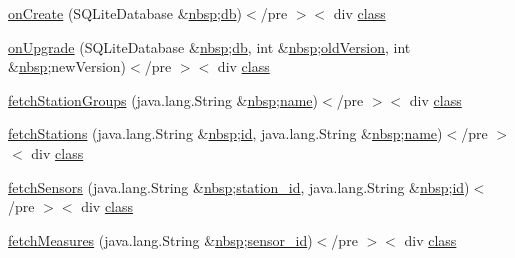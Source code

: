 \begin{DoxyCompactItemize}
\item 
\hyperlink{_cloudia_d_b_8html_a1560edfdd93f112ab4df3bc32df7892d}{on\-Create} (S\-Q\-Lite\-Database \&\hyperlink{_tools_8html_aef915316f784c9063d942974538301a6}{nbsp};\hyperlink{db_8js_ac6a1b1fd00c35062aea99d6f37a15054}{db})$<$/pre $>$$<$ div \hyperlink{_tools_8html_acf06f836132665ba8114f5a414c2403f}{class}
\item 
\hyperlink{_cloudia_d_b_8html_a875fcceb7e1a060de5aa193df5533e58}{on\-Upgrade} (S\-Q\-Lite\-Database \&\hyperlink{_tools_8html_aef915316f784c9063d942974538301a6}{nbsp};\hyperlink{db_8js_ac6a1b1fd00c35062aea99d6f37a15054}{db}, int \&\hyperlink{_tools_8html_aef915316f784c9063d942974538301a6}{nbsp};\hyperlink{_cloudia_d_b_8html_ae74b2c5e87ac6793ce49c8edfa694a35}{old\-Version}, int \&\hyperlink{_tools_8html_aef915316f784c9063d942974538301a6}{nbsp};new\-Version)$<$/pre $>$$<$ div \hyperlink{_tools_8html_acf06f836132665ba8114f5a414c2403f}{class}
\item 
\hyperlink{_cloudia_d_b_8html_a30041f3dfcd6783a7f06355b86f5a0b1}{fetch\-Station\-Groups} (java.\-lang.\-String \&\hyperlink{_tools_8html_aef915316f784c9063d942974538301a6}{nbsp};\hyperlink{_cloudia_d_b_8html_ab74e6bf80237ddc4109968cedc58c151}{name})$<$/pre $>$$<$ div \hyperlink{_tools_8html_acf06f836132665ba8114f5a414c2403f}{class}
\item 
\hyperlink{_cloudia_d_b_8html_abe34b7f0fdedccb67e4316fe403edfa6}{fetch\-Stations} (java.\-lang.\-String \&\hyperlink{_tools_8html_aef915316f784c9063d942974538301a6}{nbsp};\hyperlink{index-9_8html_aa9b8ff1d03b739d1e752b9d9a5aa7c98}{id}, java.\-lang.\-String \&\hyperlink{_tools_8html_aef915316f784c9063d942974538301a6}{nbsp};\hyperlink{_cloudia_d_b_8html_ab74e6bf80237ddc4109968cedc58c151}{name})$<$/pre $>$$<$ div \hyperlink{_tools_8html_acf06f836132665ba8114f5a414c2403f}{class}
\item 
\hyperlink{_cloudia_d_b_8html_a6ec7de3880ac902e916397fa692b887d}{fetch\-Sensors} (java.\-lang.\-String \&\hyperlink{_tools_8html_aef915316f784c9063d942974538301a6}{nbsp};\hyperlink{_cloudia_d_b_8html_a94879ab2dcd5ce6500f7cfc8503394ef}{station\-\_\-id}, java.\-lang.\-String \&\hyperlink{_tools_8html_aef915316f784c9063d942974538301a6}{nbsp};\hyperlink{index-9_8html_aa9b8ff1d03b739d1e752b9d9a5aa7c98}{id})$<$/pre $>$$<$ div \hyperlink{_tools_8html_acf06f836132665ba8114f5a414c2403f}{class}
\item 
\hyperlink{_cloudia_d_b_8html_aef6ee3d8ff03f947e7fadc9cd6d00413}{fetch\-Measures} (java.\-lang.\-String \&\hyperlink{_tools_8html_aef915316f784c9063d942974538301a6}{nbsp};\hyperlink{_my_s_q_l_connector_8measure_8html_a48a4081a48bf69abc4ba5d704ec33919}{sensor\-\_\-id})$<$/pre $>$$<$ div \hyperlink{_tools_8html_acf06f836132665ba8114f5a414c2403f}{class}

\end{DoxyCompactItemize}
